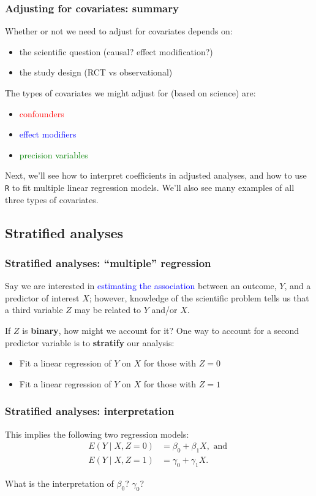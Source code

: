 \documentclass[12pt, 
hyperref={colorlinks=true, linkcolor=blue, urlcolor=cyan}]{beamer}
\begin{document}
\begin{frame}
\frametitle{Adjusting for covariates: summary}
Whether or not we need to adjust for covariates depends on: \vspace{-0.2cm}
\begin{itemize}
\item the scientific question (causal? effect modification?)
\item the study design (RCT vs observational)
\end{itemize}

The types of covariates we might adjust for (based on science) are: \vspace{-0.2cm}
\begin{itemize}
\item \textcolor{red}{confounders}
\item \textcolor{blue}{effect modifiers}
\item \textcolor{green}{precision variables}
\end{itemize}

Next, we'll see how to interpret coefficients in adjusted analyses, and how to use \texttt{R} to fit multiple linear regression models. We'll also see many examples of all three types of covariates.
\end{frame}


\subsection{Stratified analyses}
\begin{frame}
\frametitle{Stratified analyses: ``multiple'' regression}
Say we are interested in \textcolor{blue}{estimating the association} between an outcome, $Y$, and a predictor of interest $X$; however, knowledge of the scientific problem tells us that a third variable $Z$ may be related to $Y$ and/or $X$.

If $Z$ is \textbf{binary}, how might we account for it? \pause
One way to account for a second predictor variable is to \textbf{stratify} our analysis:
\begin{itemize}
\item Fit a linear regression of $Y$ on $X$ for those with $Z = 0$
\item Fit a linear regression of $Y$ on $X$ for those with $Z = 1$
\end{itemize}

\end{frame}

\begin{frame}
\frametitle{Stratified analyses: interpretation}
\vspace{-2cm}This implies the following two regression models:
\begin{align*}
E(Y \mid X, Z = 0) &= \beta_0 + \beta_1 X, \text{ and } \\
E(Y \mid X, Z = 1) &= \gamma_0 + \gamma_1 X.
\end{align*}

What is the interpretation of $\beta_0$? $\gamma_0$?
\end{frame}
\end{document}
